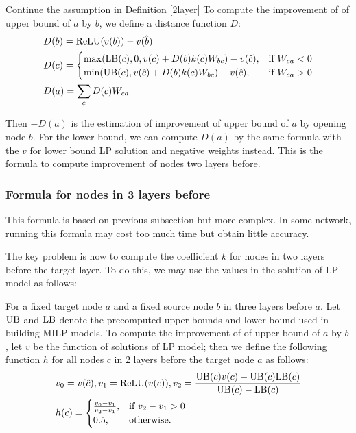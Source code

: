 \begin{definition}
	Continue the assumption in Definition \ref{2layer} To compute the improvement of of upper bound of $a$ by $b$, we define a distance function $D$:
	\begin{align}
		&D(b) = \mathrm{ReLU}(v(b))-v(\hat{b})\\
			&D(c) =
		\begin{cases}
			\max(\mathrm{LB}(c), 0, v(c)+D(b)k(c)W_{bc})-v(\hat{c}), & \text{if }W_{ca} < 0\\
			\min(\mathrm{UB}(c), v(\hat{c})+D(b)k(c)W_{bc})-v(\hat{c}), & \text{if }  W_{ca} > 0
		\end{cases}\\
		&D(a) = \sum_c D(c)W_{ca}
	\end{align}
\end{definition}

Then $-D(a)$ is the estimation of improvement of upper bound of $a$ by opening node $b$. For the lower bound, we can compute $D(a)$ by the same formula with the $v$ for lower bound LP solution and negative weights instead. This is the formula to compute improvement of nodes two layers before.


\subsubsection*{Formula for nodes in 3 layers before} 

This formula is based on previous subsection but more complex. In some network, running this formula may cost too much time but obtain little accuracy. 

The key problem is how to compute the coefficient $k$ for nodes in two layers before the target layer. To do this, we may use the values in the solution of LP model as follows:

\begin{definition}\label{3layer}
	For a fixed target node $a$ and a fixed source node $b$ in three layers before $a$. Let $\mathrm{UB}$ and $\mathrm{LB}$ denote the precomputed upper bounds and lower bound used in building MILP models. To compute the improvement of of upper bound of $a$ by $b$, let $v$ be the function of solutions of LP model; then we define the following function $h$ for all nodes $c$ in 2 layers before the target node $a$ as follows:
	\begin{align}
		&v_0 = v(\hat{c}), v_1 = \mathrm{ReLU}(v(c)), v_2 = \frac{\mathrm{UB}(c)v(c)-\mathrm{UB}(c)\mathrm{LB}(c)}{\mathrm{UB}(c)-\mathrm{LB}(c)}\\
		&h(c) =
		\begin{cases}
			\frac{v_0-v_1}{v_2-v_1}, & \text{if } v_2-v_1 > 0\\
			0.5, & \text{otherwise.}
		\end{cases}
	\end{align} 
\end{definition} 

